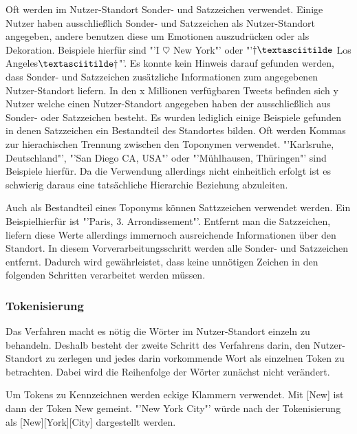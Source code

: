			  	Oft werden im Nutzer-Standort Sonder- und Satzzeichen verwendet. 
				Einige Nutzer haben ausschließlich Sonder- und Satzzeichen als Nutzer-Standort angegeben, andere benutzen diese um Emotionen auszudrücken oder als Dekoration. 
				Beispiele hierfür sind "'I $\heartsuit$ New York"' oder "'$\dagger\textasciitilde$ Los Angeles$\textasciitilde\dagger$"'.
				Es konnte kein Hinweis darauf gefunden werden, dass Sonder- und Satzzeichen zusätzliche Informationen zum angegebenen Nutzer-Standort liefern. 
				In den x Millionen verfügbaren Tweets befinden sich y Nutzer welche einen Nutzer-Standort angegeben haben der ausschließlich aus Sonder- oder Satzzeichen besteht. 
				Es wurden lediglich einige Beispiele gefunden in denen Satzzeichen ein Bestandteil des Standortes bilden.
				Oft werden Kommas zur hierachischen Trennung zwischen den Toponymen verwendet.
				"'Karlsruhe, Deutschland"', "'San Diego CA, USA"' oder "'Mühlhausen, Thüringen"' sind Beispiele hierfür.
				Da die Verwendung allerdings nicht einheitlich erfolgt ist es schwierig daraus eine tatsächliche Hierarchie Beziehung abzuleiten.

				Auch als Bestandteil eines Toponyms können Sattzzeichen verwendet werden.
				Ein Beispielhierfür ist "'Paris, 3. Arrondissement"'.
				Entfernt man die Satzzeichen, liefern diese Werte allerdings immernoch ausreichende Informationen über den Standort.  
				In diesem Vorverarbeitungsschritt werden alle Sonder- und Satzzeichen entfernt. 
				Dadurch wird gewährleistet, dass keine unnötigen Zeichen in den folgenden Schritten verarbeitet werden müssen. 

			\subsubsection{Tokenisierung}

				Das Verfahren macht es nötig die Wörter im Nutzer-Standort einzeln zu behandeln. 
				Deshalb besteht der zweite Schritt des Verfahrens darin, den Nutzer-Standort zu zerlegen und jedes darin vorkommende Wort als einzelnen Token zu betrachten. 
				Dabei wird die Reihenfolge der Wörter zunächst nicht verändert.

				Um Tokens zu Kennzeichnen werden eckige Klammern verwendet.  
				Mit [New] ist dann der Token New gemeint. 
				"'New York City"' würde nach der Tokenisierung als [New][York][City] dargestellt werden. 


